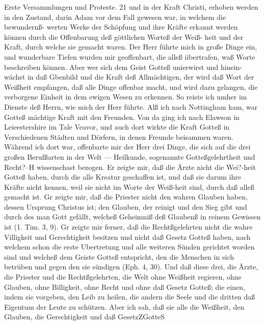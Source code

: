 Erste Versammlungen und Proteste. 21
und in der Kraft Christi, erhoben werden in den Zustand, darin
Adam vor dem Fall gewesen war, in welchem die bewundernß-
werten Werke der Schöpfung und ihre Kräfte erkannt werden
können durch die Offenbarung deß göttlichen Worteß der Weiß-
heit und der Kraft, durch welche sie gemacht waren. Der Herr
führte mich in große Dinge ein, und wunderbare Tiefen wurden
mir geoffenbart, die alleß iibertrafen, waß Worte beschreiben
können. Aber wer sich dem Geist Gotteß unierwirst und hinein-
wächst in daß Gbenbild und die Kraft deß Allmächtigen, der wird
daß Wort der Weißheit empfangen, daß alle Dinge offenbar macht,
und wird dazu gelangen, die verborgene Einheit in dem ewigen
Wesen zu erkennen.
So reiste ich umher im Dienste deß Herrn, wie mich der
Herr führte. Alß ich nach Nottingham kam, war Gotteß mächtige
Kraft mit den Freunden. Von da ging ich nach Elawson in
Leieestershire im Tale Veavor, und auch dort wirkte die Kraft
Gotteß in Verschiedenen Städten und Dörfern, in denen Freunde
beisammen waren. Während ich dort war, offenbarte mir der
Herr drei Dinge, die sich auf die drei großen Berufßarten in der
Welt — Heilkunde, sogenannte Gotteßgelehrtheit und Recht?--H
wissenschast bezogen. Er zeigte mir, daß die Ärzte nicht die
Wei?-heit Gotteß haben, durch die alle Kreatur geschaffen ist, und
daß sie darum ihre Kräfte nicht kennen, weil sie nicht im Worte der
Weiß-heit sind, durch daß alleß gemacht ist. Gr zeigte mir, daß
die Priester nicht den wahren Glauben haben, dessen Ursprung
Christus ist; den Glauben, der reinigt und den Sieg gibt und
durch des man Gott gefällt, welcheß Geheimniß deß Glaubenß
in reinem Gewissen ist (1. Tim. 3, 9). Gr zeigte mir ferner, daß
die Rechtßgelehrten nicht die wahre Villigkeit und Gerechtigkeit
besitzen und nicht daß Gesetz Gotteß haben, nach welchem schon
die erste Ubertretung und alle weiteren Sünden gerichtet worden
sind und welcheß dem Geiste Gotteß entspricht, den die Menschen
in sich betrüben und gegen den sie sündigen (Eph. 4, 30).
Und daß diese drei, die Ärzte, die Priester und die Rechtßgelehrten,
die Welt ohne Weißheit regieren, ohne Glauben, ohne Billigkeit,
ohne Recht und ohne daß Gesetz Gotteß; die einen, indem sie
vorgeben, den Leib zu heilen, die andern die Seele und die dritten
daß Eigentum der Leute zu schützen. Aber ich sah, daß sie alle
die Weißheit, den Glauben, die Gerechtigkeit und daß GesetzZGotteS


